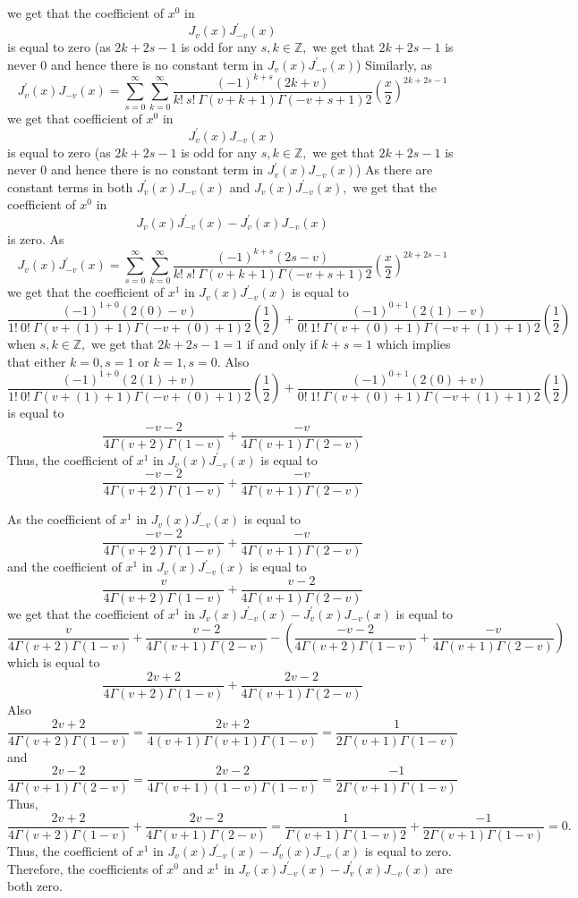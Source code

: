 we get that the coefficient of $x^{0}$ in 
$$J_{v}(x) J_{-v}^{\prime}(x)$$ is equal to zero (as $2 k+2 s-1$ is odd for any $s, k \in \mathbb{Z},$ we get that $2 k+2 s-1$ is never 0 and hence there is no constant term in $J_{v}(x) J_{-v}^{\prime}(x)$) Similarly, as 
$$J_{v}^{\prime}(x) J_{-v}(x)=\sum_{s=0}^{\infty} \sum_{k=0}^{\infty} \frac{(-1)^{k+s}(2 k+v)}{k ! \  s ! \  \Gamma(v+k+1) \Gamma(-v+s+1) 2}\left(\frac{x}{2}\right)^{2 k+2 s-1}$$ 
we get that coefficient of $x^{0}$ in 
$$J_{v}^{\prime}(x) J_{-v}(x)$$ 
is equal to zero (as $2 k+2 s-1$ is odd for any $s, k \in \mathbb{Z},$ we get that $2 k+2 s-1$ is never 0 and hence there is no constant term in $J_{v}^{\prime}(x) J_{-v}(x)$) As there are constant terms in both $J_{v}^{\prime}(x) J_{-v}(x)$ and $J_{v}(x) J_{-v}^{\prime}(x),$ we get that the coefficient of $x^{0}$ in 
$$J_{v}(x) J_{-v}^{\prime}(x)-J_{v}^{\prime}(x) J_{-v}(x)$$ 
is zero. As 
$$J_{v}(x) J_{-v}^{\prime}(x)=\sum_{s=0}^{\infty} \sum_{k=0}^{\infty} \frac{(-1)^{k+s}(2 s-v)}{k ! \  s ! \  \Gamma(v+k+1) \Gamma(-v+s+1) 2}\left(\frac{x}{2}\right)^{2 k+2 s-1}$$
we get that the coefficient
of $x^{1}$ in $J_{v}(x) J_{-v}^{\prime}(x)$ is equal to 
$$\frac{(-1)^{1+0}(2(0)-v)}{1 ! \  0 ! \  \Gamma(v+(1)+1) \Gamma(-v+(0)+1) 2}\left(\frac{1}{2}\right)+\frac{(-1)^{0+1}(2(1)-v)}{0 ! \  1 ! \  \Gamma(v+(0)+1) \Gamma(-v+(1)+1) 2}\left(\frac{1}{2}\right)$$ 
when $s, k \in \mathbb{Z},$ we get that $2 k+2 s-1=1$ if and only if $k+s=1$ which implies that either $k=0, s=1$ or $k=1, s=0$. Also 
$$\frac{(-1)^{1+0}(2(1)+v)}{1 ! \  0 ! \  \Gamma(v+(1)+1) \Gamma(-v+(0)+1) 2}\left(\frac{1}{2}\right)+\frac{(-1)^{0+1}(2(0)+v)}{0 ! \  1 ! \  \Gamma(v+(0)+1) \Gamma(-v+(1)+1) 2}\left(\frac{1}{2}\right)$$
is equal to 
$$\frac{-v-2}{4\Gamma(v+2) \Gamma(1-v) }+\frac{-v}{4\Gamma(v+1) \Gamma(2-v)}$$
Thus, the coefficient of $x^{1}$ in $J_{v}(x) J_{-v}^{\prime}(x)$ is equal to 
$$\frac{-v-2}{4\Gamma(v+2) \Gamma(1-v)}+\frac{-v}{4\Gamma(v+1) \Gamma(2-v)}$$

As the coefficient of $x^{1}$ in $J_{v}(x) J_{-v}^{\prime}(x)$ is equal to 
$$\frac{-v-2}{4\Gamma(v+2) \Gamma(1-v)}+\frac{-v}{4\Gamma(v+1) \Gamma(2-v)}$$
and the coefficient of $x^{1}$ in $J_{v}(x) J_{-v}^{\prime}(x)$ is equal to 
$$\frac{v}{4\Gamma(v+2) \Gamma(1-v) }+\frac{v-2}{4\Gamma(v+1) \Gamma(2-v)}$$
we get that the coefficient of $x^{1}$ in $J_{v}(x) J_{-v}^{\prime}(x)-J_{v}^{\prime}(x) J_{-v}(x)$ is equal to 
$$\frac{v}{4\Gamma(v+2) \Gamma(1-v) }+\frac{v-2}{4\Gamma(v+1) \Gamma(2-v)}-\left(\frac{-v-2}{4\Gamma(v+2) \Gamma(1-v)}+\frac{-v}{4\Gamma(v+1) \Gamma(2-v)}\right)$$ 
which is equal to 
$$\frac{2 v+2}{4\Gamma(v+2) \Gamma(1-v)}+\frac{2 v-2}{4\Gamma(v+1) \Gamma(2-v)}$$
Also 
$$\frac{2 v+2}{4\Gamma(v+2) \Gamma(1-v) }=\frac{2 v+2}{4(v+1) \Gamma(v+1) \Gamma(1-v)}=\frac{1}{2\Gamma(v+1) \Gamma(1-v)}$$ 
and
$$\frac{2 v-2}{4\Gamma(v+1) \Gamma(2-v)}=\frac{2 v-2}{4\Gamma(v+1)(1-v) \Gamma(1-v)}=\frac{-1}{2\Gamma(v+1) \Gamma(1-v)}$$
Thus, 
$$\frac{2 v+2}{4\Gamma(v+2) \Gamma(1-v)}+\frac{2 v-2}{4\Gamma(v+1) \Gamma(2-v)}=\frac{1}{\Gamma(v+1) \Gamma(1-v) 2}+\frac{-1}{2\Gamma(v+1) \Gamma(1-v)}=0 .$$
Thus, the coefficient of $x^{1}$ in $J_{v}(x) J_{-v}^{\prime}(x)-J_{v}^{\prime}(x) J_{-v}(x)$ is equal to zero. Therefore, the coefficients of $x^{0}$ and $x^{1}$ in $J_{v}(x) J_{-v}^{\prime}(x)-J_{v}^{\prime}(x) J_{-v}(x)$ are both zero.

